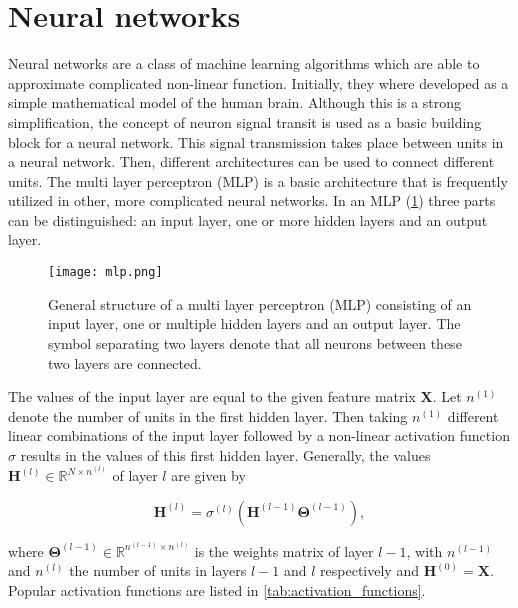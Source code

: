 \section{Neural networks}


Neural networks are a class of machine learning algorithms which are able to
approximate complicated non-linear function.\cite{cybenko1989approximation} Initially, they where developed as
a simple mathematical model of the human brain.\cite{rosenblatt1962principles} Although this is a strong
simplification, the concept of neuron signal transit is used as a basic building
block for a neural network.\cite{wang2017origin} This signal transmission
takes place between units in a neural network. Then, different architectures
can be used to connect different units. The multi layer perceptron (MLP) is a basic
architecture that is frequently utilized in other, more complicated neural networks.\cite{almeida2020multilayer}
In an MLP (\cref{fig:mlp_structure}) three parts can be distinguished: an input layer,
one or more hidden layers and an output layer.


\begin{figure}[h]
	\centering
	\texttt{[image: mlp.png]}
	\caption{General structure of a multi layer perceptron (MLP) consisting of an input layer,
		one or multiple hidden layers and an output layer. The symbol separating two layers denote that
		all neurons between these two layers are connected.}
	\label{fig:mlp_structure}
\end{figure}


The values of the input layer are equal to the given feature matrix
$\pmb{X}$. Let $n^{(1)}$ denote the number of units in the first hidden layer.
Then taking $n^{(1)}$ different linear combinations of the input layer followed by
a non-linear activation function $\sigma$ results in the values of this first hidden
layer. Generally, the values $\pmb{H}^{(l)} \in \mathbb{R}^{N \times n^{(l)}}$ of layer
$l$ are given by


\begin{equation}
	\pmb{H}^{(l)} =  \sigma^{(l)} \left(\pmb{H}^{(l-1)}\pmb{\Theta}^{(l-1)} \right),
\end{equation}


where $\pmb{\Theta}^{(l-1)} \in \mathbb{R}^{n^{(l-1)} \times n^{(l)}}$ is the weights matrix
of layer $l - 1$, with $n^{(l-1)}$ and $n^{(l)}$ the number of units in layers
$l-1$ and $l$ respectively and $\pmb{H}^{(0)} = \pmb{X}$. Popular activation
functions are listed in \cref{tab:activation_functions}.

